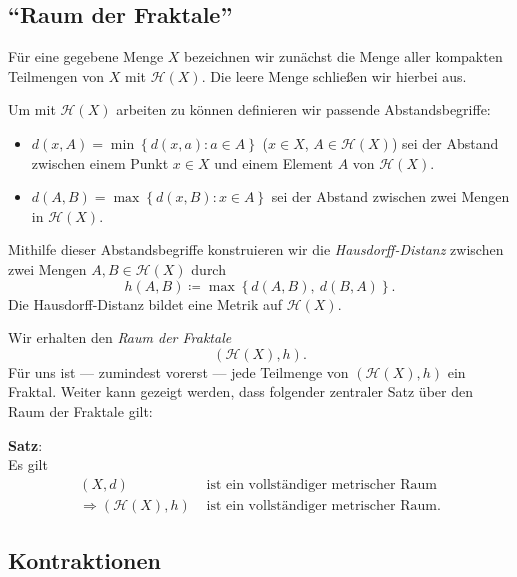 \documentclass[afourpaper]{tufte-handout}
\begin{document}
\subsection{``Raum der Fraktale''}

Für eine gegebene Menge \( X \) bezeichnen wir zunächst die Menge aller kompakten Teilmengen von \( X \) mit \( \mathcal{H}(X) \). Die leere Menge schließen wir hierbei aus.

Um mit \( \mathcal{H}(X) \) arbeiten zu können definieren wir passende Abstandsbegriffe:
\begin{itemize}
  \item \( d(x,A) = \min\left \{ d(x,a) : a \in A \right \} \) (\( x \in X \), \( A \in \mathcal{H}(X) \)) sei der Abstand zwischen einem Punkt \( x \in X \) und einem Element \( A \) von \( \mathcal{H}(X) \).
  \item \( d(A,B) = \max\left \{ d(x,B) : x \in A \right \} \) sei der Abstand zwischen zwei Mengen in \( \mathcal{H}(X) \).
\end{itemize}

Mithilfe dieser Abstandsbegriffe konstruieren wir die \emph{Hausdorff-Distanz} zwischen zwei Mengen \( A,B \in \mathcal{H}(X) \) durch
\begin{equation*}
  h(A,B) \coloneqq \max\left \{ d(A,B),\ d(B,A) \right \}\text{.}
\end{equation*}
Die Hausdorff-Distanz bildet eine Metrik auf \( \mathcal{H}(X) \).

Wir erhalten den \emph{Raum der Fraktale}
\begin{equation*}
  (\mathcal{H}(X), h)\text{.}
\end{equation*}
Für uns ist --- zumindest vorerst --- jede Teilmenge von \( (\mathcal{H}(X), h) \) ein Fraktal. Weiter kann gezeigt werden, dass folgender zentraler Satz über den Raum der Fraktale gilt:

\begin{theorembox}
  \textbf{Satz}:  \\
  \vspace{1mm}
  Es gilt
  \begin{align*}
    (X,d) &\text{ ist ein vollständiger metrischer Raum} \\
    \Rightarrow (\mathcal{H}(X), h) &\text{ ist ein vollständiger metrischer Raum.}
  \end{align*}
\end{theorembox}

\subsection{Kontraktionen}
\end{document}
